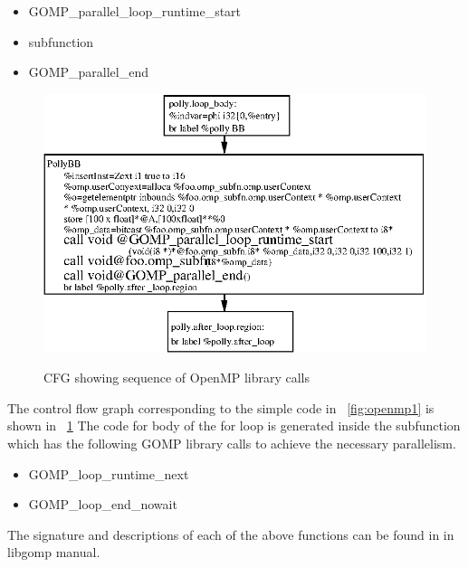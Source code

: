 \begin{itemize}
\item GOMP\_parallel\_loop\_runtime\_start
\item subfunction
\item GOMP\_parallel\_end
\end{itemize}

\begin{figure}
\begin{center}
  \label{fig:openmp_cfg}
  \includegraphics[width=14cm]{images/ompcalls.eps}
  \caption{CFG showing sequence of OpenMP library calls}
\end{center}
\end{figure}

The control flow graph corresponding to the simple code in ~\ref{fig:openmp1} is shown in ~\ref{fig:openmp_cfg}
The code for body of the for loop is generated inside the subfunction which has the following GOMP library
calls to achieve the necessary parallelism.

\begin{itemize}
\item GOMP\_loop\_runtime\_next
\item GOMP\_loop\_end\_nowait
\end{itemize}

The signature and descriptions of each of the above functions can be found in in libgomp manual\cite{libgomp}.

